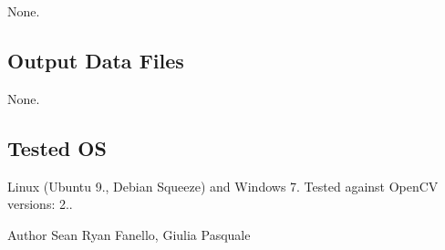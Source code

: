 None.\hypertarget{group__SFM_out_data_sec}{}\subsection{Output Data Files}\label{group__SFM_out_data_sec}
None.\hypertarget{group__SFM_tested_os_sec}{}\subsection{Tested OS}\label{group__SFM_tested_os_sec}
Linux (Ubuntu 9., Debian Squeeze) and Windows 7. Tested against Open\+CV versions\+: 2..

\begin{DoxyAuthor}{Author}
Sean Ryan Fanello, Giulia Pasquale 
\end{DoxyAuthor}

